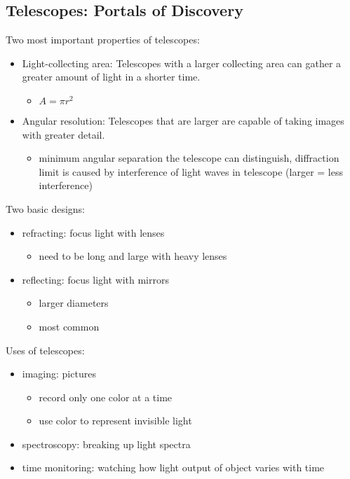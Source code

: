 \subsection{Telescopes: Portals of Discovery}
Two most important properties of telescopes:
\begin{itemize}
\item Light-collecting area: Telescopes with a larger collecting area can gather a greater amount of light in a shorter time.
\begin{itemize}
\item $A = \pi r^2$
\end{itemize}
\item Angular resolution: Telescopes that are larger are capable of taking images with greater detail.
\begin{itemize}
\item minimum angular separation the telescope can distinguish, diffraction limit is caused by interference of light waves in telescope (larger = less interference)
\end{itemize}
\end{itemize}
Two basic designs:
\begin{itemize}
\item refracting: focus light with lenses
\begin{itemize}
\item need to be long and large with heavy lenses
\end{itemize}
\item reflecting: focus light with mirrors
\begin{itemize}
\item larger diameters
\item most common
\end{itemize}
\end{itemize}
Uses of telescopes:
\begin{itemize}
\item imaging: pictures
\begin{itemize}
\item record only one color at a time
\item use color to represent invisible light
\end{itemize}
\item spectroscopy: breaking up light spectra
\item time monitoring: watching how light output of object varies with time
\end{itemize}

